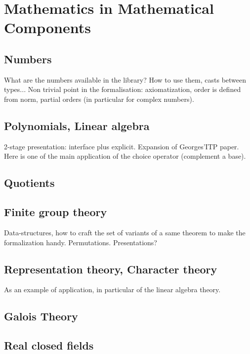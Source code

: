 \documentclass{book}
\begin{document}
\part{Mathematics in Mathematical Components}

\chapter{Numbers}

What are the numbers available in the library? How to use them, casts
between types... Non trivial point in the formalisation:
axiomatization, order is defined from norm, partial orders (in
particular for complex numbers).


\chapter{Polynomials, Linear algebra}

2-stage presentation: interface plus explicit. Expansion of
Georges'ITP paper. Here is one of the main application of the choice
operator (complement a base).

\chapter{Quotients}

\chapter{Finite group theory}

Data-structures, how to craft the set of variants of a same theorem to
make the formalization handy. Permutations. Presentations?

\chapter{Representation theory, Character theory}

As an example of application, in particular of the linear algebra
theory.

\chapter{Galois Theory}


\chapter{Real closed fields}
\end{document}
